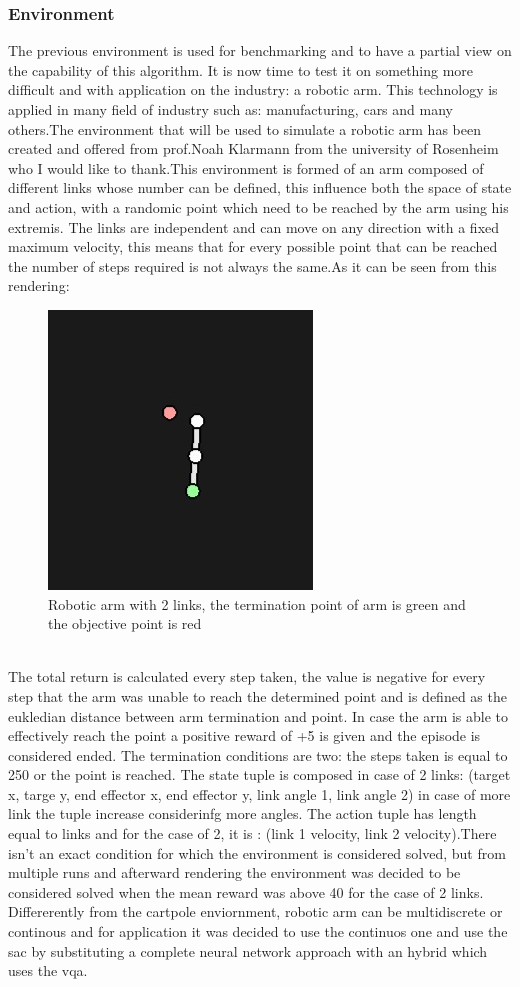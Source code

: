 \subsubsection{Environment}
The previous environment is used for benchmarking and to have a partial view on the capability of this algorithm. It is now time to test it on something more difficult and with application on the industry: a robotic arm. This technology is applied in many field of industry such as: manufacturing, cars and many others.The environment that will be used to simulate a robotic arm has been created and offered from prof.Noah Klarmann from the university of Rosenheim who I would like to thank.This environment is formed of an arm composed of different links whose number can be defined, this influence both the space of state and action, with a randomic point which need to be reached by the arm using his extremis. The links are independent and can move on any direction with a fixed maximum velocity, this means that for every possible point that can be reached the number of steps required is not always the same.As it can be seen from this rendering:
\begin{figure}[h]
	\centering
	\includegraphics[width=0.45\linewidth]{img/quantum_robotic_arm_SAC_4182}
	\caption{Robotic arm with 2 links, the termination point of arm is green and the objective point is red}
	\label{fig:roboticarmsac}
\end{figure}\\
The total return is calculated every step taken, the value is negative for every step that the arm was unable to reach the determined point and is defined as the eukledian distance between arm termination and point. In case the arm is able to effectively reach the point a positive reward of +5 is given and the episode is considered ended. The termination conditions are two: the steps taken is equal to 250 or the point is reached. The state tuple is composed in case of 2 links: (target x, targe y, end effector x, end effector y, link angle 1, link angle 2) in case of more link the tuple increase considerinfg more angles. The action tuple has length equal to links and for the case of 2, it is : (link 1 velocity, link 2 velocity).There isn't an exact condition for which the environment is considered solved, but from multiple runs and afterward rendering the environment was decided to be considered solved when the mean reward was above 40 for the case of 2 links.
Differerently from the cartpole enviornment, robotic arm can be multidiscrete or continous and for application it was decided to use the continuos one and use the \acrfull{sac} by substituting a complete neural network approach with an hybrid which uses the \acrshort{vqa}.
